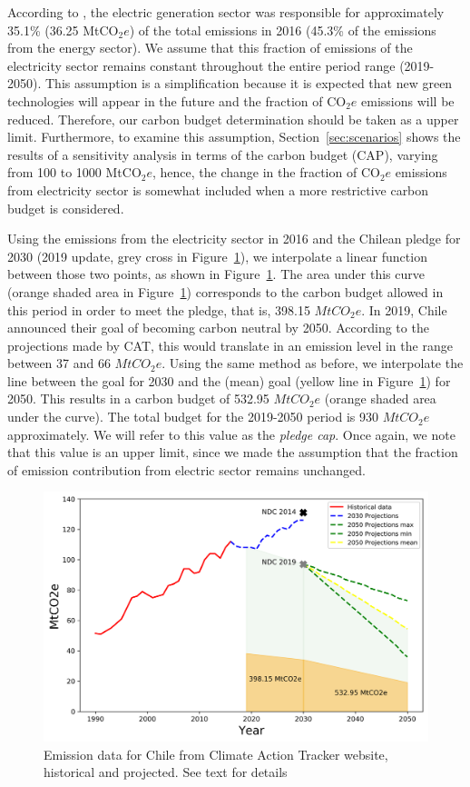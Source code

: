 \documentclass[11pt, letterpaper]{article}
\begin{document}
\smallskip

According to \cite{ChileInformeBienal2016}, the electric generation sector was responsible for approximately 35.1\% (36.25 MtCO$_2e$) of the total emissions in 2016 (45.3\% of the emissions from the energy sector). We assume that this fraction of emissions of the electricity sector remains constant throughout the entire period range (2019-2050). This assumption is a simplification because it is expected that new green technologies will appear in the future and the fraction of CO$_2e$ emissions will be reduced. Therefore, our carbon budget determination should be taken as a upper limit. Furthermore, to examine this assumption, Section~\ref{sec:scenarios} shows the results of a sensitivity analysis in terms of the carbon budget (CAP), varying from 100 to 1000 MtCO$_2e$, hence, the change in the fraction of CO$_2e$ emissions from electricity sector is somewhat included when a more restrictive carbon budget is considered. 

Using the emissions from the electricity sector in 2016 and the Chilean pledge for 2030 (2019 update, grey cross in Figure~\ref{fig:cap}), we interpolate a linear function between those two points, as shown in Figure~\ref{fig:cap}. The area under this curve (orange shaded area in Figure~\ref{fig:cap}) corresponds to the carbon budget allowed in this period in order to meet the pledge, that is, 398.15 $MtCO_2e$. In 2019, Chile announced their goal of becoming carbon neutral by 2050. According to the projections made by CAT, this would translate in an emission level in the range between 37 and 66 $MtCO_2e$. Using the same method as before, we interpolate the line between the goal for 2030 and the (mean) goal (yellow line in Figure~\ref{fig:cap}) for 2050. This results in a carbon budget of 532.95 $MtCO_2e$ (orange shaded area under the curve). The total budget for the 2019-2050 period is 930 $MtCO_2e$ approximately. We will refer to this value as the \textit{pledge cap}. Once again, we note that this value is an upper limit, since we made the assumption that the fraction of emission contribution from electric sector remains unchanged.

\begin{figure}[ht!]
\centering
 \includegraphics[width=5in]{Figures/cap_ext.png}
 \caption{Emission data for Chile from Climate Action Tracker website, historical and projected. See text for details}
  \label{fig:cap}
  \end{figure}
\end{document}

